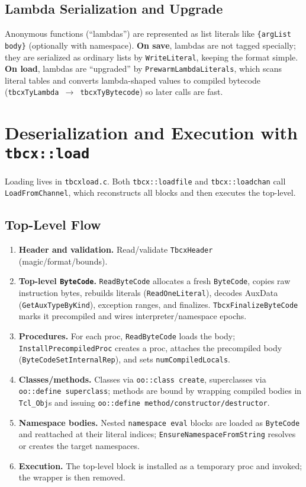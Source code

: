 \documentclass[11pt,a4paper]{article}
\begin{document}
\subsection{Lambda Serialization and Upgrade}
Anonymous functions (“lambdas”) are represented as list literals like \texttt{\{argList body\}} (optionally with namespace). \textbf{On save}, lambdas are not tagged specially; they are serialized as ordinary lists by \texttt{WriteLiteral}, keeping the format simple.
\textbf{On load}, lambdas are “upgraded” by \texttt{PrewarmLambdaLiterals}, which scans literal tables and converts lambda-shaped values to compiled bytecode (\texttt{tbcxTyLambda $\rightarrow$ tbcxTyBytecode}) so later calls are fast.

\section{Deserialization and Execution with \texttt{tbcx::load}}
Loading lives in \texttt{tbcxload.c}. Both \texttt{tbcx::loadfile} and \texttt{tbcx::loadchan} call \texttt{LoadFromChannel}, which reconstructs all blocks and then executes the top-level.

\subsection{Top-Level Flow}
\begin{enumerate}
  \item \textbf{Header and validation.} Read/validate \texttt{TbcxHeader} (magic/format/bounds).
  \item \textbf{Top-level \texttt{ByteCode}.} \texttt{ReadByteCode} allocates a fresh \texttt{ByteCode}, copies raw instruction bytes, rebuilds literals (\texttt{ReadOneLiteral}), decodes AuxData (\texttt{GetAuxTypeByKind}), exception ranges, and finalizes. \texttt{TbcxFinalizeByteCode} marks it precompiled and wires interpreter/namespace epochs.
  \item \textbf{Procedures.} For each proc, \texttt{ReadByteCode} loads the body; \texttt{InstallPrecompiledProc} creates a proc, attaches the precompiled body (\texttt{ByteCodeSetInternalRep}), and sets \texttt{numCompiledLocals}.
  \item \textbf{Classes/methods.} Classes via \texttt{oo::class create}, superclasses via \texttt{oo::define superclass}; methods are bound by wrapping compiled bodies in \texttt{Tcl\_Obj}s and issuing \texttt{oo::define method/constructor/destructor}.
  \item \textbf{Namespace bodies.} Nested \texttt{namespace eval} blocks are loaded as \texttt{ByteCode} and reattached at their literal indices; \texttt{EnsureNamespaceFromString} resolves or creates the target namespaces.
  \item \textbf{Execution.} The top-level block is installed as a temporary proc and invoked; the wrapper is then removed.
\end{enumerate}
\end{document}
